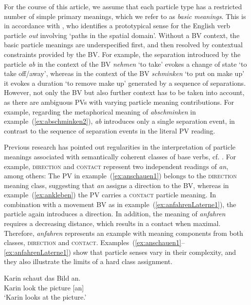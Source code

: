 \documentclass[output=paper]{langsci/langscibook}
\begin{document}
For the course of this article, we assume that each particle type has
a restricted number of simple primary meanings, which we refer to as
\textit{basic meanings}. This is in accordance with \cite{Lindner:83},
who identifies a prototypical sense for the English verb particle
\textit{out} involving `paths in the spatial domain'. Without a BV
context, the basic particle meanings are underspecified first, and
then resolved by contextual constraints provided by the BV. For
example, the separation introduced by the particle \textit{ab} in the
context of the BV \textit{nehmen} `to take' evokes a change of state
`to take off/away', whereas in the context of the BV
\textit{schminken} `to put on make up' it evokes a duration `to
remove make up' generated by a sequence of separations. However, not
only the BV but also further context has to be taken into account, as
there are ambiguous PVs with varying particle meaning
contributions. For example, regarding the metaphorical meaning of
\textit{abschminken} in example~(\ref{ex:abschminken2}), \textit{ab}
introduces only a single separation event, in contrast to the sequence
of separation events in the literal PV reading.

Previous research has pointed out regularities in the interpretation
of particle meanings associated with semantically coherent classes of
base verbs,
cf. \cite{Stiebels:96,Lechler/Rossdeutscher:09,Kliche:11,Springorum:11}.
For example, \textsc{direction} and \textsc{contact} represent two
independent readings of \textit{an}, among others: The PV in
example~(\ref{ex:anschauen1}) belongs to the \textsc{direction}
meaning class, suggesting that \textit{an} assigns a direction to the
BV, whereas in example~(\ref{ex:ankleben}) the PV carries a
\textsc{contact} particle meaning. In combination with a movement BV
as in example~(\ref{ex:anfahrenLaterne1}), the particle again
introduces a direction. In addition, the meaning of \textit{anfahren}
requires a decreasing distance, which results in a contact when
maximal. Therefore, \textit{anfahren} represents an example with
meaning components from both classes, \textsc{direction} and
\textsc{contact}. Examples~(\ref{ex:anschauen1}--\ref{ex:anfahrenLaterne1})
show that particle senses vary in their complexity, and they also
illustrate the limits of a hard class assignment.

\ea\label{ex:anschauen1}
\gll Karin schaut das Bild an.\\
Karin look the picture [an]\\
\glt `Karin looks at the picture.'
\z
\end{document}

